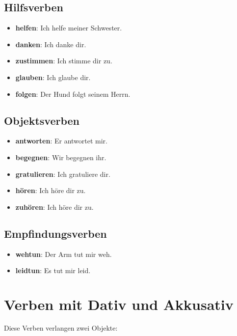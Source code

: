 \subsection{Hilfsverben}
\begin{itemize}
    \item \textbf{helfen}: Ich helfe meiner Schwester.
    \item \textbf{danken}: Ich danke dir.
    \item \textbf{zustimmen}: Ich stimme dir zu.
    \item \textbf{glauben}: Ich glaube dir.
    \item \textbf{folgen}: Der Hund folgt seinem Herrn.
\end{itemize}

\subsection{Objektsverben}
\begin{itemize}
    \item \textbf{antworten}: Er antwortet mir.
    \item \textbf{begegnen}: Wir begegnen ihr.
    \item \textbf{gratulieren}: Ich gratuliere dir.
    \item \textbf{hören}: Ich höre dir zu.
    \item \textbf{zuhören}: Ich höre dir zu.
\end{itemize}

\subsection{Empfindungsverben}
\begin{itemize}
    \item \textbf{wehtun}: Der Arm tut mir weh.
    \item \textbf{leidtun}: Es tut mir leid.
\end{itemize}

\section{Verben mit Dativ und Akkusativ}
\label{sec:VerbenMitDatAkk}

Diese Verben verlangen zwei Objekte:

